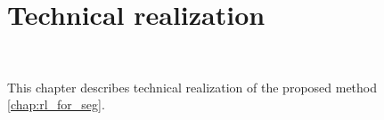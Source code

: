 \chapter{Technical realization}~\label{chap:impl}

This chapter describes technical realization of the proposed method \ref{chap:rl_for_seg}.